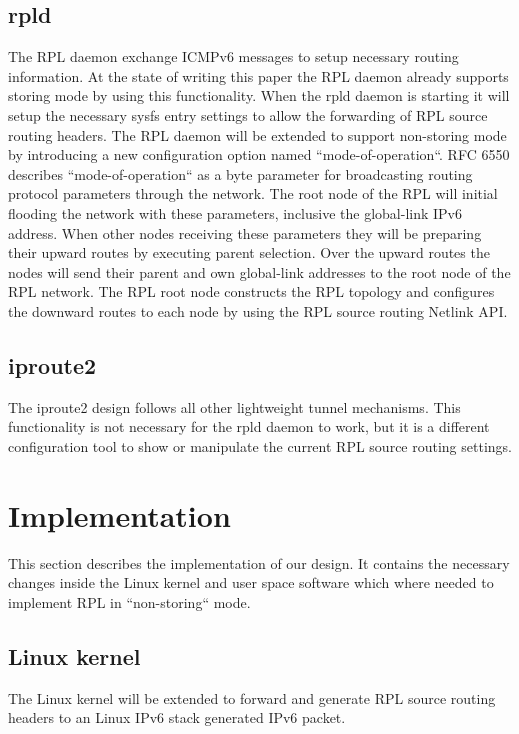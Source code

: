\documentclass[letterpaper]{article}
\begin{document}
\subsection{rpld}

The RPL daemon exchange ICMPv6 messages to setup necessary routing information.
At the state of writing this paper the RPL daemon already supports storing mode
by using this functionality.
When the rpld daemon is starting it will setup the necessary sysfs entry settings to allow the forwarding of RPL source routing headers.
The RPL daemon will be extended to support non-storing mode by introducing a new configuration option named ``mode-of-operation``.
RFC 6550 describes ``mode-of-operation`` as a byte parameter for broadcasting routing protocol parameters through the network.
The root node of the RPL will initial flooding the network with these
parameters, inclusive the global-link IPv6 address.
When other nodes receiving these parameters they will be preparing their upward
routes by executing parent selection.
Over the upward routes the nodes will send their parent and own global-link
addresses to the root node of the RPL network.
The RPL root node constructs the RPL topology and configures the downward routes to each node by using the RPL source routing Netlink API.

\subsection{iproute2}

The iproute2 design follows all other lightweight tunnel mechanisms.
This functionality is not necessary for the rpld daemon to work, but it is a different configuration tool to show or manipulate the current RPL source routing settings.

\section{Implementation}

This section describes the implementation of our design. It contains the
necessary changes inside the Linux kernel and user space software which where needed to implement RPL in ``non-storing`` mode.

\subsection{Linux kernel}

The Linux kernel will be extended to forward and generate RPL source routing
headers to an Linux IPv6 stack generated IPv6 packet.
\end{document}
